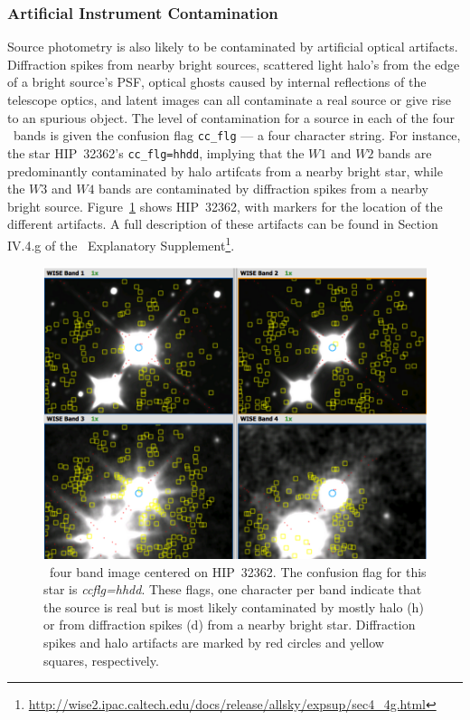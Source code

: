     
        \subsubsection{Artificial Instrument Contamination}
    Source photometry is also likely to be contaminated by artificial optical artifacts.  Diffraction spikes from nearby bright sources, scattered light halo's from the edge of a bright source's PSF, optical ghosts caused by internal reflections of the telescope optics, and latent images can all contaminate a real source or give rise to an spurious object. The level of contamination for a source in each of the four \WS\ bands is given  the confusion flag \verb|cc_flg| --- a four character string. For instance, the star HIP~32362's \verb|cc_flg=hhdd|, implying that the $W1$ and $W2$ bands are predominantly contaminated by halo artifcats from a nearby bright star, while the $W3$ and $W4$ bands are contaminated by diffraction spikes from a nearby bright source. Figure~\ref{fig:ccflag_contamination} shows HIP~32362, with markers for the location of the different artifacts. A full description of these artifacts can be found in Section IV.4.g of the \WS\ Explanatory Supplement\footnote{\url{http://wise2.ipac.caltech.edu/docs/release/allsky/expsup/sec4_4g.html}}. 
        
        
        \begin{figure}[!h]
        \centering
        \includegraphics[width=\textwidth]{Ch2/ccflag_hhdd_HIP32362}
        \caption[Contamination From Optical Articats]{\WS\ four band image centered on HIP~32362. The confusion flag for this star is \textit{ccflg=hhdd}. These flags, one character per band indicate that the source is real but is most likely contaminated by mostly halo (h) or from diffraction spikes (d) from a nearby bright star. Diffraction spikes and halo artifacts are marked by red circles and yellow squares, respectively.}
        \label{fig:ccflag_contamination}
        \end{figure}
        
